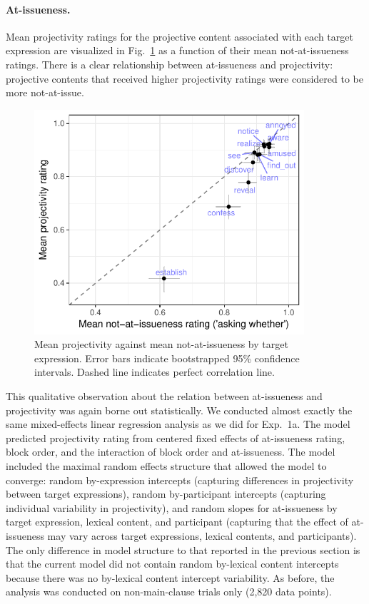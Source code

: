 \documentclass[11pt,fleqn]{article}
\newcommand{\6}{\mbox{$[\hspace*{-.6mm}[$}}
\newcommand{\9}{\mbox{$]\hspace*{-.6mm}]$}}
\newcommand{\figref}[1]{Fig.~\ref{#1}}
\begin{document}
\paragraph{At-issueness.} Mean projectivity ratings for the projective content associated with each target expression are visualized in \figref{fig:f-proj-ai-1b} as a function of their mean not-at-issueness ratings. There is a clear relationship between at-issueness and projectivity: projective contents that received higher projectivity ratings were considered to be more not-at-issue. 

\begin{figure}[!h]

\begin{center}
\includegraphics[width=10cm]{../results/exp1b/graphs/ai-proj-bytrigger-labels}
\end{center}

\caption{Mean projectivity against mean not-at-issueness by target expression. Error bars indicate bootstrapped 95\% confidence intervals. Dashed line indicates perfect correlation line.}
\label{fig:f-proj-ai-1b}
\end{figure}

This qualitative observation about the relation between at-issueness and projectivity was again borne out statistically. We conducted almost exactly the same mixed-effects linear regression analysis as we did for Exp.~1a. The model predicted projectivity rating from centered fixed effects of at-issueness rating, block order, and the interaction of block order and at-issueness. The model included the maximal random effects structure that allowed the model to converge: random by-expression intercepts (capturing differences in projectivity between target expressions),  random by-participant intercepts (capturing individual variability in projectivity), and random slopes for at-issueness by target expression, lexical content, and participant (capturing that the effect of at-issueness may vary across target expressions, lexical contents, and participants). The only difference in model structure to that reported in the previous section is that the current model did not contain random by-lexical content intercepts because there was no by-lexical content intercept variability. As before, the analysis was conducted on non-main-clause trials only (2,820 data points).
\end{document}
